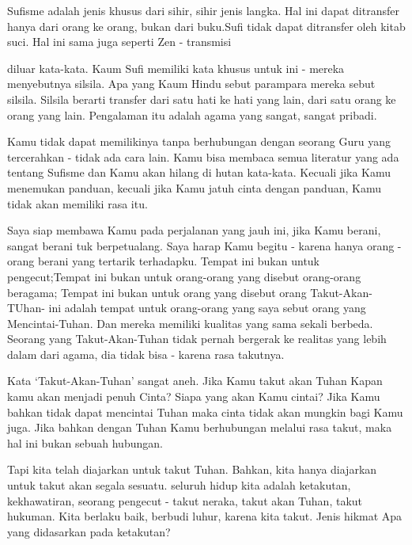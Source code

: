 Sufisme adalah jenis khusus dari sihir, sihir jenis langka. Hal ini dapat ditransfer hanya dari orang ke
orang, bukan dari buku.Sufi tidak dapat ditransfer oleh kitab suci. Hal ini sama juga seperti Zen - transmisi


diluar kata-kata. Kaum Sufi memiliki kata khusus untuk ini - mereka menyebutnya silsila. Apa yang Kaum Hindu sebut parampara mereka sebut silsila. Silsila berarti transfer dari satu hati ke hati yang lain, dari satu orang ke orang yang lain. Pengalaman itu adalah agama yang sangat, sangat  pribadi.

Kamu tidak dapat memilikinya tanpa berhubungan dengan seorang Guru yang tercerahkan - tidak ada cara lain. Kamu bisa membaca semua literatur yang ada tentang Sufisme dan Kamu akan hilang di hutan kata-kata. Kecuali jika Kamu menemukan panduan, kecuali jika Kamu jatuh cinta dengan panduan, Kamu tidak akan memiliki rasa itu.

Saya siap membawa Kamu pada perjalanan yang jauh ini, jika Kamu berani, sangat berani tuk berpetualang. Saya harap Kamu begitu - karena hanya orang - orang berani yang tertarik terhadapku. Tempat ini bukan untuk pengecut;Tempat ini bukan untuk orang-orang yang disebut orang-orang beragama; Tempat ini bukan untuk orang yang disebut orang Takut-Akan-TUhan- ini adalah tempat untuk orang-orang yang saya sebut orang yang Mencintai-Tuhan. Dan mereka memiliki kualitas yang sama sekali berbeda. Seorang yang Takut-Akan-Tuhan tidak pernah bergerak ke realitas yang lebih dalam dari agama, dia tidak bisa - karena rasa takutnya.

Kata ‘Takut-Akan-Tuhan’ sangat aneh. Jika Kamu takut akan Tuhan Kapan kamu akan menjadi penuh Cinta?
Siapa yang akan Kamu cintai? Jika Kamu bahkan tidak dapat mencintai Tuhan maka cinta tidak akan mungkin bagi Kamu juga. Jika bahkan dengan Tuhan Kamu berhubungan melalui rasa takut, maka hal ini bukan sebuah hubungan.

Tapi kita telah diajarkan untuk takut Tuhan. Bahkan, kita hanya diajarkan untuk takut akan
segala sesuatu. seluruh hidup kita adalah ketakutan, kekhawatiran, seorang pengecut - takut neraka, takut akan Tuhan, takut hukuman. Kita berlaku baik, berbudi luhur, karena kita takut. Jenis hikmat Apa yang didasarkan pada ketakutan?

